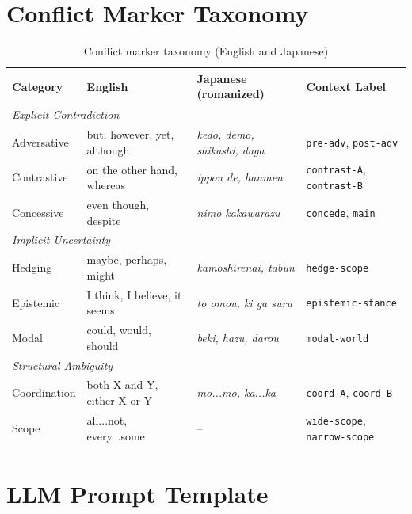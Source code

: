 \documentclass[11pt,a4paper]{article}
\begin{document}
\appendix

\section{Conflict Marker Taxonomy}
\label{app:markers}

\begin{table}[h]
\centering
\small
\begin{tabular}{llll}
\toprule
\textbf{Category} & \textbf{English} & \textbf{Japanese (romanized)} & \textbf{Context Label} \\
\midrule
\multicolumn{4}{l}{\textit{Explicit Contradiction}} \\
Adversative & but, however, yet, although & \textit{kedo, demo, shikashi, daga} & \texttt{pre-adv}, \texttt{post-adv} \\
Contrastive & on the other hand, whereas & \textit{ippou de, hanmen} & \texttt{contrast-A}, \texttt{contrast-B} \\
Concessive & even though, despite & \textit{nimo kakawarazu} & \texttt{concede}, \texttt{main} \\
\midrule
\multicolumn{4}{l}{\textit{Implicit Uncertainty}} \\
Hedging & maybe, perhaps, might & \textit{kamoshirenai, tabun} & \texttt{hedge-scope} \\
Epistemic & I think, I believe, it seems & \textit{to omou, ki ga suru} & \texttt{epistemic-stance} \\
Modal & could, would, should & \textit{beki, hazu, darou} & \texttt{modal-world} \\
\midrule
\multicolumn{4}{l}{\textit{Structural Ambiguity}} \\
Coordination & both X and Y, either X or Y & \textit{mo...mo, ka...ka} & \texttt{coord-A}, \texttt{coord-B} \\
Scope & all...not, every...some & -- & \texttt{wide-scope}, \texttt{narrow-scope} \\
\bottomrule
\end{tabular}
\caption{Conflict marker taxonomy (English and Japanese)}
\label{tab:markers-full}
\end{table}

\section{LLM Prompt Template}
\label{app:prompt}
\end{document}
